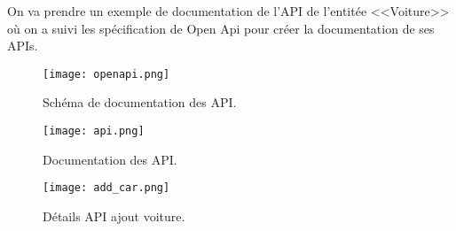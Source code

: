 On va prendre un exemple de documentation de l'API de l'entitée <<Voiture>> où on a suivi les spécification de Open Api pour créer la documentation de ses APIs.
\begin{figure}[H]
    \centering
    \texttt{[image: openapi.png]}
    \captionsetup{justification=centering}
    \caption{Schéma de documentation des API.}
    \label{fig:api_doc_schema}
\end{figure}
\newpage
\begin{figure}[H]
    \centering
    \texttt{[image: api.png]}
    \captionsetup{justification=centering}
    \caption{Documentation des API.}
    \label{fig:api_doc}
\end{figure}
\begin{figure}[H]
    \centering
    \texttt{[image: add\_car.png]}
    \captionsetup{justification=centering}
    \caption{Détails API ajout voiture.}
    \label{fig:api_doc_detail}
\end{figure}
\clearpage
